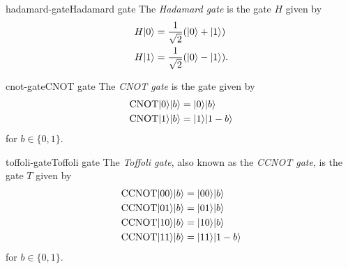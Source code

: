 \begin{topic}{hadamard-gate}{Hadamard gate}
    The \emph{Hadamard gate} is the  gate $H$ given by
    \[ \begin{aligned}
        H |0\rangle &= \frac{1}{\sqrt{2}} (|0\rangle + |1\rangle) \\
        H |1\rangle &= \frac{1}{\sqrt{2}} (|0\rangle - |1\rangle) .
    \end{aligned} \]
\end{topic}

\begin{topic}{cnot-gate}{CNOT gate}
    The \emph{CNOT gate} is the  gate given by
    \[ \begin{aligned}
        \textup{CNOT} |0\rangle |b\rangle &= |0\rangle |b\rangle \\
        \textup{CNOT} |1\rangle |b\rangle &= |1\rangle |1 - b\rangle
    \end{aligned} \]
    for $b \in \{ 0, 1 \}$.
\end{topic}

\begin{topic}{toffoli-gate}{Toffoli gate}
    The \emph{Toffoli gate}, also known as the \emph{CCNOT gate}, is the  gate $T$ given by
    \[ \begin{aligned}
        \textup{CCNOT} |00\rangle |b\rangle &= |00\rangle |b\rangle \\
        \textup{CCNOT} |01\rangle |b\rangle &= |01\rangle |b\rangle \\
        \textup{CCNOT} |10\rangle |b\rangle &= |10\rangle |b\rangle \\
        \textup{CCNOT} |11\rangle |b\rangle &= |11\rangle |1 - b\rangle
    \end{aligned} \]
    for $b \in \{ 0, 1 \}$.
\end{topic}
